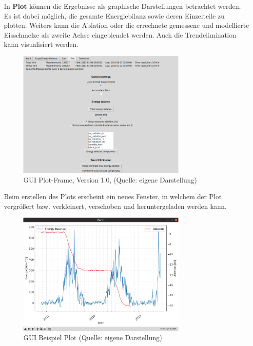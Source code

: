 \documentclass[11pt,a4paper]{article}
\newcommand{\guiplotsize}{0.75}
\newcommand{\guiversion}{1.0}
\begin{document}
In \textbf{Plot} können die Ergebnisse als graphische Darstellungen betrachtet werden. Es ist dabei möglich, die gesamte Energiebilanz sowie deren Einzelteile zu plotten. Weiters kann die Ablation oder die errechnete gemessene und modellierte Eisschmelze als zweite Achse eingeblendet werden. Auch die Trendelimination kann visualisiert werden.

\begin{figure}[H]
\centering
\includegraphics[width=\guiplotsize\textwidth]{pictures/GUI/Plot_Frame.png}
\caption[GUI Plot-Frame, Version \guiversion]{GUI Plot-Frame, Version \guiversion, (Quelle: eigene Darstellung)}
\label{fig:GUI Plot-Frame}
\end{figure}

Beim erstellen des Plots erscheint ein neues Fenster, in welchem der Plot vergrößert bzw. verkleinert, verschoben und heruntergeladen werden kann.

\begin{figure}[H]
\centering
\includegraphics[width=\guiplotsize\textwidth]{pictures/GUI/Sample_Plot.png}
\caption[GUI Beispiel Plot]{GUI Beispiel Plot (Quelle: eigene Darstellung)}
\label{fig:GUI Beispiel Plot}
\end{figure}
\end{document}
